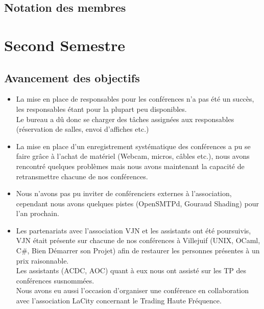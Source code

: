 \documentclass[12pt]{report}
\begin{document}
  \section{Notation des membres}
  
  \chapter{Second Semestre}
  \section{Avancement des objectifs}
  \begin{itemize}
          \item La mise en place de responsables pour les conférences n'a pas
                  été un succès, les responsables étant pour la plupart peu
                  disponibles.\\
                  Le bureau a dû donc se charger des tâches assignées aux
                  responsables (réservation de salles, envoi d'affiches etc.)
          \item La mise en place d'un enregistrement systématique des
                  conférences a pu se faire grâce à l'achat de matériel
                  (Webcam, micros, câbles etc.), nous avons rencontré quelques
                  problèmes mais nous avons maintenant la capacité de
                  retransmettre chacune de nos conférences.\\
          \item Nous n'avons pas pu inviter de conférenciers externes à
                  l'association, cependant nous avons quelques pistes
                  (OpenSMTPd, Gouraud Shading) pour l'an prochain.\\
          \item Les partenariats avec l'association VJN et les assistants ont
                  été poursuivis, VJN était présente sur chacune de nos
                  conférences à Villejuif (UNIX, OCaml, C\#, Bien Démarrer son
                  Projet) afin de restaurer les personnes présentes à un prix
                  raisonnable.\\
                  Les assistants (ACDC, AOC) quant à eux nous ont assisté sur
                  les TP des conférences susnommées.\\
                  Nous avons eu aussi l'occasion d'organiser une conférence en
                  collaboration avec l'association LaCity concernant le Trading
                  Haute Fréquence.
  \end{itemize}
  \newpage
\end{document}
